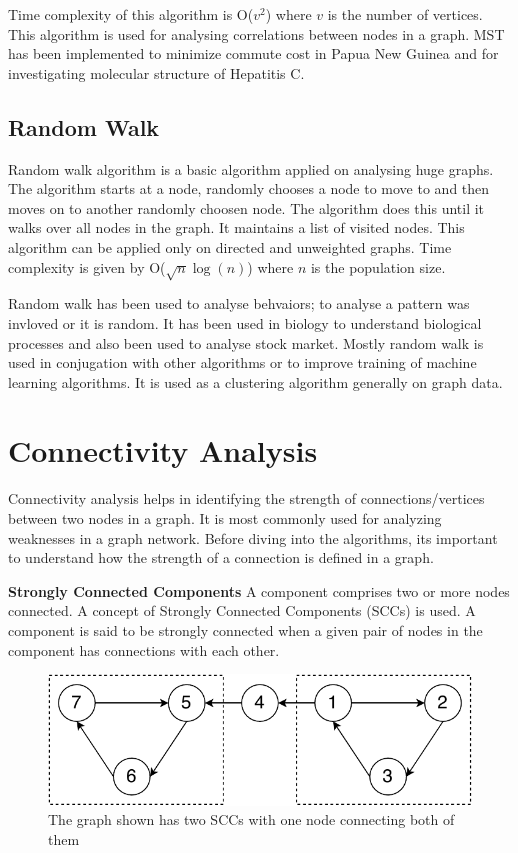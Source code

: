 \documentclass[journal,twoside,web]{ieeecolor}
\begin{document}
Time complexity of this algorithm is O($v^2$) where $v$ is the number of vertices. This algorithm is used for analysing correlations between nodes in a graph. MST has been implemented to minimize commute cost in Papua New Guinea\cite{13} and for investigating molecular structure of Hepatitis C\cite{50}.

\subsection{Random Walk}
Random walk algorithm is a basic algorithm applied on analysing huge graphs. The algorithm starts at a node, randomly chooses a node to move to and then moves on to another randomly choosen node. The algorithm does this until it walks over all nodes in the graph. It maintains a list of visited nodes. This algorithm can be applied only on directed and unweighted graphs. Time complexity is given by O($\sqrt{n}\log(n)$) where $n$ is the population size.

Random walk has been used to analyse behvaiors; to analyse a pattern was invloved or it is random. It has been used in biology to understand biological processes\cite{51} and also been used to analyse stock market\cite{52}. Mostly random walk is used in conjugation with other algorithms\cite{53} or to improve training of machine learning algorithms\cite{54}. It is used as a clustering algorithm generally on graph data.

\section{Connectivity Analysis}
\label{sec:connectivity}
Connectivity analysis helps in identifying the strength of connections/vertices between two nodes in a graph. It is most commonly used for analyzing weaknesses in a graph network. Before diving into the algorithms, its important to understand how the strength of a connection is defined in a graph.

\textbf{Strongly Connected Components}\label{sec:scc}
A component comprises two or more nodes connected. A concept of Strongly Connected Components (SCCs)\cite{39} is used. A component is said to be strongly connected when a given pair of nodes in the component has connections with each other.

\begin{figure}[!h]
    \centerline{\includegraphics[scale=0.75]{figures/scc.pdf}}
    \caption{The graph shown has two SCCs with one node connecting both of them}
    \label{fig4}
\end{figure}
\end{document}
